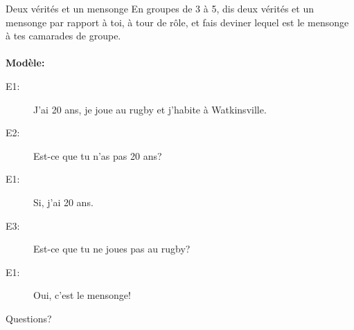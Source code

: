 \documentclass{beamer}
\begin{document}
  \begin{frame}{Deux vérités et un mensonge }
    En groupes de 3 à 5, dis deux vérités et un mensonge par rapport à toi, à tour de rôle, et fais deviner lequel est le mensonge à tes camarades de groupe. \\
     \\
    \textbf{Modèle:} \\
    \begin{description}
      \item[E1:] J'ai 20 ans, je joue au rugby et j'habite à Watkinsville.
      \item[] 
      \item[E2:] Est-ce que tu n'as pas 20 ans?
      \item[] 
      \item[E1:] Si, j'ai 20 ans.
      \item[] 
      \item[E3:] Est-ce que tu ne joues pas au rugby?
      \item[] 
      \item[E1:] Oui, c'est le mensonge!
      \item[] 
    \end{description}
  \end{frame}

  \begin{frame}{}
    \begin{center}
      \Large Questions?
    \end{center}
  \end{frame}
\end{document}
